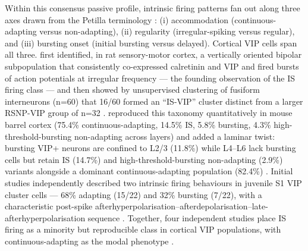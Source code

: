 \documentclass[11pt]{article}
\begin{document}
Within this consensus passive profile, intrinsic firing patterns fan out along three axes drawn from the Petilla terminology \citep{Thepetillainterneuronnomenclaturegroupping2008}: (i) accommodation (continuous-adapting versus non-adapting), (ii) regularity (irregular-spiking versus regular), and (iii) bursting onset (initial bursting versus delayed). Cortical VIP cells span all three. \citet{Cauli1997} first identified, in rat sensory-motor cortex, a vertically oriented bipolar subpopulation that consistently co-expressed calretinin and VIP and fired bursts of action potentials at irregular frequency --- the founding observation of the IS firing class --- and \citet{Cauli2000} then showed by unsupervised clustering of fusiform interneurons (n=60) that 16/60 formed an ``IS-VIP'' cluster distinct from a larger RSNP-VIP group of n=32 \citep{Cauli2000}. \citet{Pronneke2015} reproduced this taxonomy quantitatively in mouse barrel cortex (75.4\% continuous-adapting, 14.5\% IS, 5.8\% bursting, 4.3\% high-threshold-bursting non-adapting across layers) and added a laminar twist: bursting VIP+ neurons are confined to L2/3 (11.8\%) while L4--L6 lack bursting cells but retain IS (14.7\%) and high-threshold-bursting non-adapting (2.9\%) variants alongside a dominant continuous-adapting population (82.4\%) \citep{Pronneke2015}. Initial studies \citep{Vucurovic2010} independently described two intrinsic firing behaviours in juvenile S1 VIP cluster cells --- 68\% adapting (15/22) and 32\% bursting (7/22), with a characteristic post-spike afterhyperpolarisation--afterdepolarisation--late-afterhyperpolarisation sequence \citep{Vucurovic2010}. Together, four independent studies place IS firing as a minority but reproducible class in cortical VIP populations, with continuous-adapting as the modal phenotype \citep{Cauli1997, Cauli2000, Pronneke2015, Walker2016}.
\end{document}
